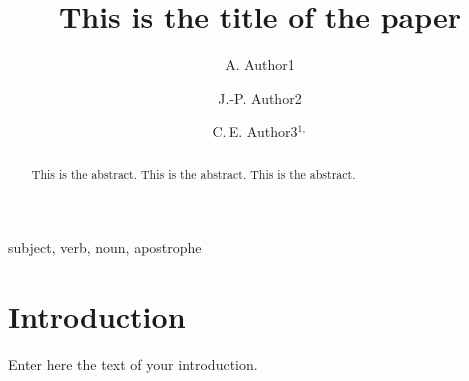 \documentclass{sf2a-conf2023}
\begin{document}


\title{This is the title of the paper}


\author{A. Author1}\address{Timberland Observatory, 34560 City, Neverland}

\author{J.-P. Author2}\address{Institute XYZ, 1299 City, OtherLand}



\author{C.\,E. Author3$^{1,}$}\address{Dept. of Chess, University of Games, 35101 Las Vegas, Monaco} 


\setcounter{page}{237}




\maketitle


\begin{abstract}
This is the abstract. This is the abstract. This is the abstract.
\end{abstract}


\begin{keywords}
subject, verb, noun, apostrophe
\end{keywords}



\section{Introduction}
  Enter here the text of your introduction.
  
\end{document}
